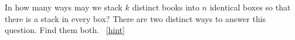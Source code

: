 \documentclass{book}
\begin{document}
\setcounter{project}{131}
\addtocounter{project}{-1}
\begin{activity}[]\label{brokenpermutation}
\hypertarget{p-924}{}%
In how many ways may we stack \(k\) distinct books into \(n\) identical boxes so that there is a stack in every box? There are two distinct ways to answer this question.  Find them both.%
~\hfill{\tiny\hyperlink{a-131}{[hint]}\hypertarget{q-131}{}}\end{activity}
\end{document}
